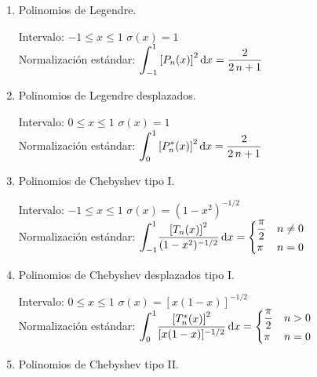 \documentclass[12pt]{article}
\def\scaleint#1{\vcenter{\hbox{\scaleto[3ex]{\displaystyle\int}{#1}}}}
\def\bs{\mkern-12mu}
\numberwithin{equation}{section}
\begin{document}
\begin{enumerate}
\item Polinomios de Legendre.

\begin{center}
Intervalo: $-1 \leq x \leq 1$ \hspace{1.5cm} $\sigma (x) = 1$ \\[1em]
Normalización estándar: $\displaystyle \scaleint{6ex}_{\bs -1}^{1} \left[ P_{n} (x) \right]^{2} \dd{x} = \dfrac{2}{2 \, n + 1}$
\end{center}
\item Polinomios de Legendre desplazados.

\begin{center}
Intervalo: $0 \leq x \leq 1$ \hspace{1.5cm}  $\sigma (x) =  1$ \\[1em]
Normalización estándar: $\displaystyle \scaleint{6ex}_{\bs 0}^{1} \left[ P_{n}^{*}(x) \right]^{2} \dd{x} = \dfrac{2}{2 \, n + 1}$  
\end{center}
\item Polinomios de Chebyshev tipo I.

\begin{center}
Intervalo: $-1 \leq x \leq 1$ \hspace{1.5cm} $\sigma (x) = (1 - x^{2})^{-1/2}$ \\[1em]
Normalización estándar: $\scaleint{6ex}_{\bs -1}^{1} \dfrac{\left[ T_{n}(x) \right]^{2}}{(1 - x^{2})^{-1/2}} \dd{x} = \begin{cases} 
\displaystyle \frac{\pi}{2} & n \neq 0 \\
\pi & n = 0 \end{cases}$
\end{center}

\item Polinomios de Chebyshev desplazados tipo I.

\begin{center}
Intervalo: $0 \leq x \leq 1$ \hspace{1.5cm} $\sigma (x) = [x (1 - x)]^{-1/2}$ \\[1em]
Normalización estándar: $\scaleint{6ex}_{\bs 0}^{1} \dfrac{\left[ T_{n}^{*} (x) \right]^{2}}{[x (1 - x)]^{-1/2}} \dd{x} = \begin{cases} 
\displaystyle \frac{\pi}{2} & n > 0 \\
\pi & n = 0 \end{cases}$
\end{center}
\item Polinomios de Chebyshev tipo II.


\end{enumerate}
\end{document}
